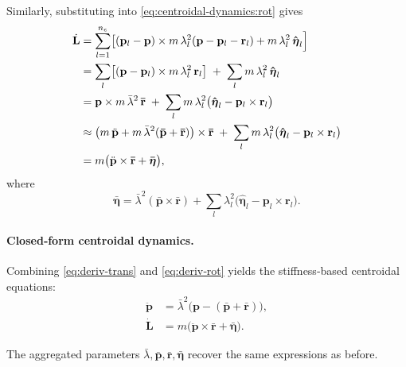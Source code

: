 \documentclass[main.tex]{subfiles}
\begin{document}
\begin{sloppypar}
Similarly, substituting into \eqref{eq:centroidal‐dynamics:rot} gives
\begin{align}
\dot{\mathbf{L}}
&= \sum_{l=1}^{n_e}\bigl[(\mathbf{p}_l - \mathbf{p})\times m\,\lambda_l^2(\mathbf{p} - \mathbf{p}_l - \mathbf{r}_l) + m\,\lambda_l^2\,\mathbf{\hat{\boldsymbol{\eta}}}_l\Bigr]
\notag\\
&= \sum_{l}\bigl[(\mathbf{p} - \mathbf{p}_l)\times m\,\lambda_l^2\,\mathbf{r}_l\bigr]
   \;+\;\sum_{l}m\,\lambda_l^2\,\mathbf{\hat{\boldsymbol{\eta}}}_l
\notag\\
&= \mathbf{p} \times m\,\bar\lambda^2\,\mathbf{\bar{r}}
   \;+\;\sum_{l}m\,\lambda_l^2\bigl(\mathbf{\hat{\boldsymbol{\eta}}}_l - \mathbf{p}_l\times \mathbf{r}_l\bigr)
\notag\\
&\approx \bigl(m\,\ddot{\mathbf{p}} + m\,\bar\lambda^2(\mathbf{\bar{p}}+\mathbf{\bar{r}})\bigr)\times \mathbf{\bar{r}}
   \;+\;\sum_{l}m\,\lambda_l^2\bigl(\mathbf{\hat{\boldsymbol{\eta}}}_l - \mathbf{p}_l\times \mathbf{r}_l\bigr)
\notag\\
&= m\bigl(\ddot{\mathbf{p}}\times \mathbf{\bar{r}} + \mathbf{\bar{\boldsymbol{\eta}}}\bigr),
\label{eq:deriv‐rot}
\end{align}
where
\[
\mathbf{\bar{\boldsymbol{\eta}}}
= \bar\lambda^2(\mathbf{\bar{p}}\times \mathbf{\bar{r}})
  + \sum_{l}\lambda_l^2\bigl(\mathbf{\hat{\boldsymbol{\eta}}}_l - \mathbf{p}_l\times \mathbf{r}_l\bigr).
\]

\medskip
\paragraph{Closed‐form centroidal dynamics.}
Combining \eqref{eq:deriv‐trans} and \eqref{eq:deriv‐rot} yields the stiffness‐based centroidal equations:
\begin{subequations}\label{eq:stiff‐centroidal}
\begin{align}
\ddot{\mathbf{p}} &= \bar\lambda^2\bigl(\mathbf{p} - (\mathbf{\bar{p}} + \mathbf{\bar{r}})\bigr),
\label{eq:stiff‐centroidal:trans}\\
\dot{\mathbf{L}} &= m\bigl(\ddot{\mathbf{p}} \times \mathbf{\bar{r}} + \mathbf{\bar{\boldsymbol{\eta}}}\bigr).
\label{eq:stiff‐centroidal:rot}
\end{align}
\end{subequations}
 
\noindent
The aggregated parameters $\bar\lambda,\mathbf{\bar{p}},\mathbf{\bar{r}},\mathbf{\bar{\boldsymbol{\eta}}}$ recover the same expressions as before. 


\end{sloppypar}
\end{document}
